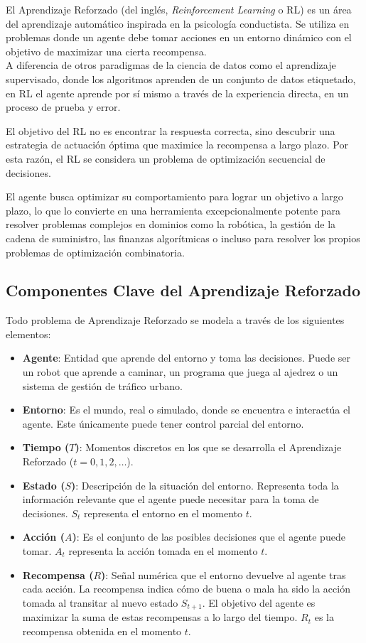 \documentclass[12pt,a4paper]{book}
\begin{document}
El Aprendizaje Reforzado \cite{intro_reforzado} (del inglés, \textit{Reinforcement Learning} o RL) es un área del aprendizaje automático inspirada en la psicología conductista. Se utiliza en problemas donde un agente debe tomar acciones en un entorno dinámico con el objetivo de maximizar una cierta recompensa.\\
A diferencia de otros paradigmas de la ciencia de datos como el aprendizaje supervisado, donde los algoritmos aprenden de un conjunto de datos etiquetado, en RL el agente aprende por sí mismo a través de la experiencia directa, en un proceso de prueba y error. 

El objetivo del RL no es encontrar la respuesta correcta, sino descubrir una estrategia de actuación óptima que maximice la recompensa a largo plazo. Por esta razón, el RL se considera un problema de optimización secuencial de decisiones.

El agente busca optimizar su comportamiento para lograr un objetivo a largo plazo, lo que lo convierte en una herramienta excepcionalmente potente para resolver problemas complejos en dominios como la robótica, la gestión de la cadena de suministro, las finanzas algorítmicas o incluso para resolver los propios problemas de optimización combinatoria.

\subsection{Componentes Clave del Aprendizaje Reforzado}

Todo problema de Aprendizaje Reforzado se modela a través de los siguientes elementos:

\begin{itemize}
    \item \textbf{Agente}: Entidad que aprende del entorno y toma las decisiones. Puede ser un robot que aprende a caminar, un programa que juega al ajedrez o un sistema de gestión de tráfico urbano.
    \item \textbf{Entorno}: Es el mundo, real o simulado, donde se encuentra e interactúa el agente. Este únicamente puede tener control parcial del entorno.
    \item \textbf{Tiempo ($T$)}: Momentos discretos en los que se desarrolla el Aprendizaje Reforzado ($t=0, 1, 2, \dots$).
    \item \textbf{Estado ($S$)}: Descripción de la situación del entorno. Representa toda la información relevante que el agente puede necesitar para la toma de decisiones. $S_t$ representa el entorno en el momento $t$.
    \item \textbf{Acción ($A$)}: Es el conjunto de las posibles decisiones que el agente puede tomar. $A_t$ representa la acción tomada en el momento $t$.
    \item \textbf{Recompensa ($R$)}: Señal numérica que el entorno devuelve al agente tras cada acción. La recompensa indica cómo de buena o mala ha sido la acción tomada al transitar al nuevo estado $S_{t+1}$. El objetivo del agente es maximizar la suma de estas recompensas a lo largo del tiempo. $R_t$ es la recompensa obtenida en el momento $t$.
\end{itemize}
\end{document}

